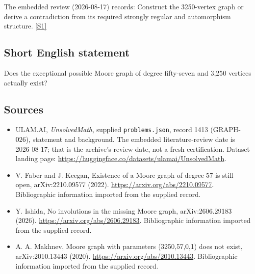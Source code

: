 \documentclass[11pt,a4paper]{article}
\newcommand{\sref}[2]{\hyperlink{source:#1:#2}{[S#2]}}
\begin{document}
The embedded review (2026-08-17) records: Construct the 3250-vertex graph or derive a contradiction from its required strongly regular and automorphism structure. \sref{1413}{1}

\subsection{Short English statement}

Does the exceptional possible Moore graph of degree fifty-seven and 3,250 vertices actually exist?

\subsection{Sources}

{\small

\begin{itemize}

\item[\hypertarget{source:1413:1}{S1}] ULAM.AI, \emph{UnsolvedMath}, supplied \texttt{problems.json}, record 1413 (GRAPH-026), statement and background. The embedded literature-review date is 2026-08-17; that is the archive’s review date, not a fresh certification. Dataset landing page: \url{https://huggingface.co/datasets/ulamai/UnsolvedMath}.

\item[\hypertarget{source:1413:2}{S2}] V. Faber and J. Keegan, Existence of a Moore graph of degree 57 is still open, arXiv:2210.09577 (2022). \url{https://arxiv.org/abs/2210.09577}. Bibliographic information imported from the supplied record.

\item[\hypertarget{source:1413:3}{S3}] Y. Ishida, No involutions in the missing Moore graph, arXiv:2606.29183 (2026). \url{https://arxiv.org/abs/2606.29183}. Bibliographic information imported from the supplied record.

\item[\hypertarget{source:1413:4}{S4}] A. A. Makhnev, Moore graph with parameters (3250,57,0,1) does not exist, arXiv:2010.13443 (2020). \url{https://arxiv.org/abs/2010.13443}. Bibliographic information imported from the supplied record.

\end{itemize}

}

\label{end:1413}
\end{document}

